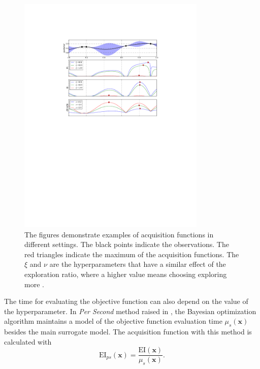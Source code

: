 \begin{figure}[htb]
\centering
\includegraphics[width=0.8\textwidth]{figures/bayopt_acqui.pdf}
\caption{The figures demonstrate examples of acquisition functions in different settings. The black points indicate the observations. The red triangles indicate the maximum of the acquisition functions. The $\xi$ and $\nu$ are the hyperparameters that have a similar effect of the exploration ratio, where a higher value means choosing exploring more \cite{brochu2010tutorial}.}
\label{bayesian optimization2}
\end{figure}

The time for evaluating the objective function can also depend on the value of the hyperparameter. In \textit{Per Second}  method raised in \cite{snoek2012practical}, the Bayesian optimization algorithm maintains a model of the objective function evaluation time $\mu_{s}(\mathbf{x})$ besides the main surrogate model. The acquisition function with this method is calculated with 
\begin{equation}
    \mathrm{EI}_{ps}(\mathbf{x})=\frac{\mathrm{EI}(\mathbf{x})}{\mu_{s}(\mathbf{x})}.
\end{equation}



\FloatBarrier

